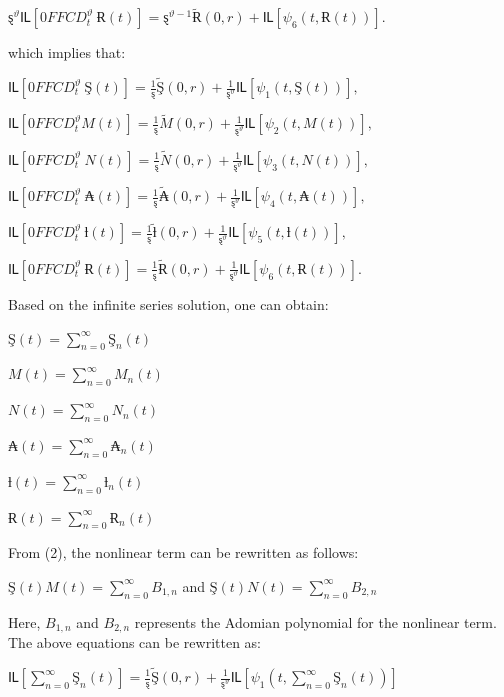 \documentclass[
]{article}
\begin{document}
\(ȿ^{\vartheta}Ỻ\left\lbrack 0FFCD_{t}^{\vartheta}\ Ɍ(t) \right\rbrack = ȿ^{\vartheta - 1}\widetilde{Ɍ}(0,r) + Ỻ\left\lbrack \psi_{6}\left( t,Ɍ(t) \right) \right\rbrack\).

which implies that:

\(Ỻ\left\lbrack 0FFCD_{t}^{\vartheta}\ Ş(t) \right\rbrack = \frac{1}{ȿ}\widetilde{Ş}(0,r) + \frac{1}{ȿ^{\vartheta}}Ỻ\left\lbrack \psi_{1}\left( t,Ş(t) \right) \right\rbrack,\)

\(Ỻ\left\lbrack 0FFCD_{t}^{\vartheta}M(t) \right\rbrack = \frac{1}{ȿ}\widetilde{M}(0,r) + \frac{1}{ȿ^{\vartheta}}Ỻ\left\lbrack \psi_{2}\left( t,M(t) \right) \right\rbrack,\)

\(Ỻ\left\lbrack 0FFCD_{t}^{\vartheta}\ N(t) \right\rbrack = \frac{1}{ȿ}\widetilde{N}(0,r) + \frac{1}{ȿ^{\vartheta}}Ỻ\left\lbrack \psi_{3}\left( t,N(t) \right) \right\rbrack,\)

\(Ỻ\left\lbrack 0FFCD_{t}^{\vartheta}\ ₳(t) \right\rbrack = \frac{1}{ȿ}\widetilde{₳}(0,r) + \frac{1}{ȿ^{\vartheta}}Ỻ\left\lbrack \psi_{4}\left( t,₳(t) \right) \right\rbrack,\)

\(Ỻ\left\lbrack 0FFCD_{t}^{\vartheta}\ ƚ(t) \right\rbrack = \frac{1}{ȿ}\widetilde{ƚ}(0,r) + \frac{1}{ȿ^{\vartheta}}Ỻ\left\lbrack \psi_{5}\left( t,ƚ(t) \right) \right\rbrack,\)

\(Ỻ\left\lbrack 0FFCD_{t}^{\vartheta}\ Ɍ(t) \right\rbrack = \frac{1}{ȿ}\widetilde{Ɍ}(0,r) + \frac{1}{ȿ^{\vartheta}}Ỻ\left\lbrack \psi_{6}\left( t,Ɍ(t) \right) \right\rbrack.\)

Based on the infinite series solution, one can obtain:

\(Ş(t) = \sum_{n = 0}^{\infty}{}Ş_{n}(t)\)

\(M(t) = \sum_{n = 0}^{\infty}{}M_{n}(t)\)

\(N(t) = \sum_{n = 0}^{\infty}{}N_{n}(t)\)

\(₳(t) = \sum_{n = 0}^{\infty}{}₳_{n}(t)\)

\(ƚ(t) = \sum_{n = 0}^{\infty}{}ƚ_{n}(t)\)

\(Ɍ(t) = \sum_{n = 0}^{\infty}{}Ɍ_{n}(t)\)

From (2), the nonlinear term can be rewritten as follows:

\(Ş(t)M(t) = \sum_{n = 0}^{\infty}{}B_{1,n}\) and \(Ş(t)N(t) = \sum_{n = 0}^{\infty}{}B_{2,n}\)

Here, \(B_{1,n}\) and \(B_{2,n}\) represents the Adomian polynomial for the nonlinear term. The above equations can be rewritten as:

\(Ỻ\left\lbrack \sum_{n = 0}^{\infty}{}Ş_{n}(t) \right\rbrack = \frac{1}{ȿ}\widetilde{Ş}(0,r) + \frac{1}{ȿ^{\vartheta}}Ỻ\left\lbrack \psi_{1}\left( t,\sum_{n = 0}^{\infty}{}Ş_{n}(t) \right) \right\rbrack\)
\end{document}
